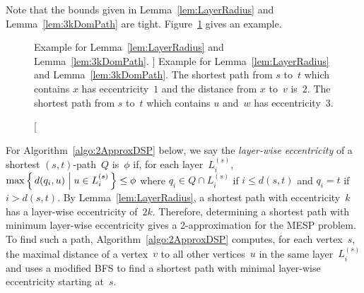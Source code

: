 Note that the bounds given in Lemma~\ref{lem:LayerRadius} and Lemma~\ref{lem:3kDomPath} are tight.
Figure~\ref{fig:approxExample} gives an example.

\begin{figure}
    [htb]
    \centering
    
    \caption
    [%
        Example for Lemma~\ref{lem:LayerRadius} and Lemma~\ref{lem:3kDomPath}.
    ]
    {
        Example for Lemma~\ref{lem:LayerRadius} and Lemma~\ref{lem:3kDomPath}.
        The shortest path from $s$ to~$t$ which contains $x$ has eccentricity~$1$ and the distance from $x$ to~$v$ is~$2$.
        The shortest path from $s$ to~$t$ which contains $u$ and~$w$ has eccentricity~$3$.
    }
    \label{fig:approxExample}
\end{figure}

For Algorithm~\ref{algo:2ApproxDSP} below, we say the \emph{layer-wise eccentricity} of a shortest $(s,t)$-path~$Q$ is~$\phi$ if, for each layer~$L_i^{(s)}$, $\max \left \{ \, d(q_i, u) \Bigm| u \in L_i^{(s)} \, \right \} \leq \phi$ where $q_i \in Q \cap L_i^{(s)}$ if $i \leq d(s, t)$ and $q_i = t$ if $i > d(s, t)$.
By Lemma~\ref{lem:LayerRadius}, a shortest path with eccentricity~$k$ has a layer-wise eccentricity of~$2k$.
Therefore, determining a shortest path with minimum layer-wise eccentricity gives a 2-approximation for the MESP problem.
To find such a path, Algorithm~\ref{algo:2ApproxDSP} computes, for each vertex~$s$, the maximal distance of a vertex~$v$ to all other vertices~$u$ in the same layer~$L_i^{(s)}$ and uses a modified BFS to find a shortest path with minimal layer-wise eccentricity starting at~$s$.

